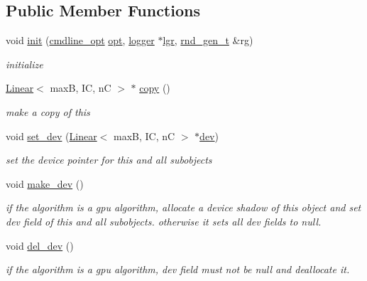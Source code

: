\subsection*{Public Member Functions}
\begin{DoxyCompactItemize}
\item 
void \hyperlink{structLinear_a45f2c4c010a2451d39e0a7e736fd4a58}{init} (\hyperlink{structcmdline__opt}{cmdline\+\_\+opt} \hyperlink{structLinear_ad6b0173f0baf5ce07b3cd7340d4ed0d4}{opt}, \hyperlink{structlogger}{logger} $\ast$\hyperlink{structLinear_acde13832b627b3c1113283e22bac77a7}{lgr}, \hyperlink{structrnd__gen__t}{rnd\+\_\+gen\+\_\+t} \&rg)
\begin{DoxyCompactList}\small\item\em initialize \end{DoxyCompactList}\item 
\hyperlink{structLinear}{Linear}$<$ maxB, IC, nC $>$ $\ast$ \hyperlink{structLinear_a0c7811cf3a3731974b668f7e973a79f4}{copy} ()
\begin{DoxyCompactList}\small\item\em make a copy of this \end{DoxyCompactList}\item 
void \hyperlink{structLinear_a0c6dcb67669d4984b6b9a676d4f14177}{set\+\_\+dev} (\hyperlink{structLinear}{Linear}$<$ maxB, IC, nC $>$ $\ast$\hyperlink{structLinear_a84bf1832fbbaccc87ca3e13b45f5acb4}{dev})
\begin{DoxyCompactList}\small\item\em set the device pointer for this and all subobjects \end{DoxyCompactList}\item 
void \hyperlink{structLinear_aecf7edf669cf1182b49b604a2c9b3212}{make\+\_\+dev} ()
\begin{DoxyCompactList}\small\item\em if the algorithm is a gpu algorithm, allocate a device shadow of this object and set dev field of this and all subobjects. otherwise it sets all dev fields to null. \end{DoxyCompactList}\item 
void \hyperlink{structLinear_ad691fa515105ec71c69eed5f0ae03af6}{del\+\_\+dev} ()
\begin{DoxyCompactList}\small\item\em if the algorithm is a gpu algorithm, dev field must not be null and deallocate it. \end{DoxyCompactList}\item 

\end{DoxyCompactItemize}
